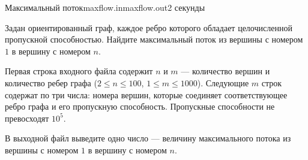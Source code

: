 \begin{problem}{Максимальный поток}{maxflow.in}{maxflow.out}{2 секунды}

Задан ориентированный граф, каждое ребро которого обладает целочисленной
пропускной способностью. 
Найдите максимальный поток из вершины с номером $1$ в вершину с номером $n$.

\InputFile

Первая строка входного файла содержит $n$ и $m$ --- количество
вершин и количество ребер графа ($2 \le n \le 100$,
$1 \le m \le 1000$). 
Следующие $m$ строк содержат по три числа:
номера вершин, которые соединяет соответствующее ребро графа и его пропускную способность.
Пропускные способности не превосходят $10^5$.

\OutputFile

В выходной файл выведите одно число --- величину максимального потока  из вершины с номером  $1$ в вершину с номером $n$.

\Examples

\begin{example}
%
\end{example}

\end{problem}
                                                 
